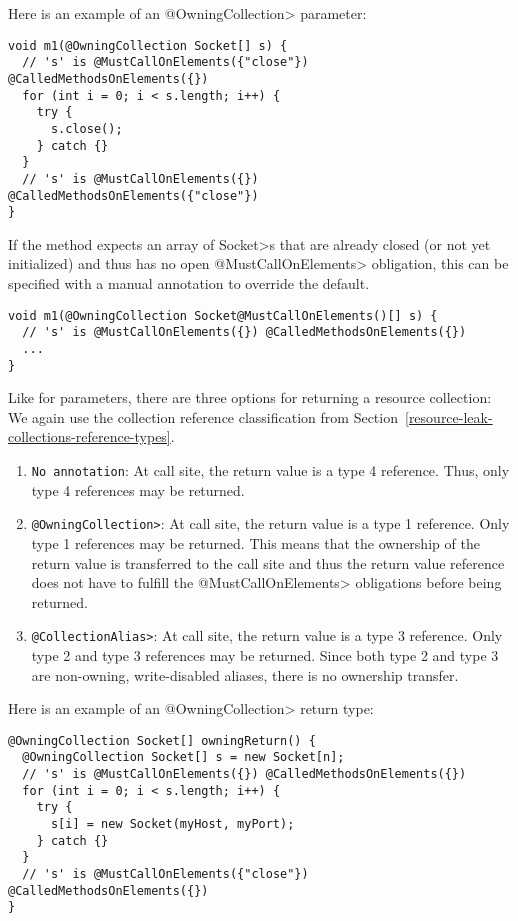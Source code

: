 Here is an example of an \<@OwningCollection> parameter:
\begin{verbatim}
void m1(@OwningCollection Socket[] s) {
  // 's' is @MustCallOnElements({"close"}) @CalledMethodsOnElements({})
  for (int i = 0; i < s.length; i++) {
    try {
      s.close();
    } catch {}
  }
  // 's' is @MustCallOnElements({}) @CalledMethodsOnElements({"close"})
}
\end{verbatim}

If the method expects an array of \<Socket>s that are already closed (or not yet initialized) and thus has no open \<@MustCallOnElements> obligation, this can be specified with a manual annotation to override the default.

\begin{verbatim}
void m1(@OwningCollection Socket@MustCallOnElements()[] s) {
  // 's' is @MustCallOnElements({}) @CalledMethodsOnElements({})
  ...
}
\end{verbatim}

Like for parameters, there are three options for returning a resource collection:
We again use the collection reference classification from Section~\ref{resource-leak-collections-reference-types}.
\begin{enumerate}
  \item \texttt{No annotation}: At call site, the return value is a type 4 reference. Thus, only type 4 references may be returned.
  \item \texttt{\<@OwningCollection>}: At call site, the return value is a type 1 reference. Only type 1 references may be returned. This means that the ownership of the return value is transferred to the call site and thus the return value reference does not have to fulfill the \<@MustCallOnElements> obligations before being returned.
  \item \texttt{\<@CollectionAlias>}: At call site, the return value is a type 3 reference. Only type 2 and type 3 references may be returned. Since both type 2 and type 3 are non-owning, write-disabled aliases, there is no ownership transfer.
\end{enumerate}

Here is an example of an \<@OwningCollection> return type:
\begin{verbatim}
@OwningCollection Socket[] owningReturn() {
  @OwningCollection Socket[] s = new Socket[n];
  // 's' is @MustCallOnElements({}) @CalledMethodsOnElements({})
  for (int i = 0; i < s.length; i++) {
    try {
      s[i] = new Socket(myHost, myPort);
    } catch {}
  }
  // 's' is @MustCallOnElements({"close"}) @CalledMethodsOnElements({})
}
\end{verbatim}

